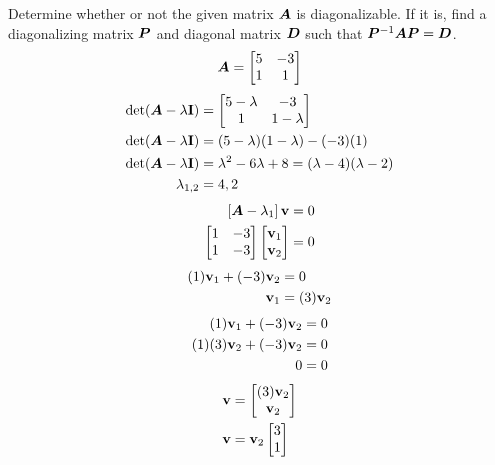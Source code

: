 \documentclass{article}
\begin{document}
Determine whether or not the given matrix $ \bm{A} $ is diagonalizable. If it is, find a diagonalizing matrix $ \bm{P} $ and diagonal matrix $ \bm{D} $ such that $ \bm{P}^{-1}\bm{A}\bm{P} = \bm{D} $.
\begin{equation*}
	\bm{A} =
		\begin{bmatrix}
			5 & -3 \\
			1 & 1
		\end{bmatrix}
\end{equation*}
\begin{align*}
	\det( \matr{A} - \lambda \vect{I} ) & =
		\begin{bmatrix}
			5 - \lambda & -3 \\
			1 & 1 - \lambda
		\end{bmatrix} \\
	\det( \matr{A} - \lambda \vect{I} ) & =
		(5 - \lambda)(1 - \lambda) - (-3)(1) \\
	\det( \matr{A} - \lambda \vect{I} ) & =
		\lambda^2 - 6\lambda + 8 = (\lambda - 4)(\lambda - 2) \\
	\lambda_{1,2} & = 4, 2
\end{align*}
\begin{align*}
	\left[ \matr{A} - \lambda_1 \right] \vect{v} & = 0 \\
	\begin{bmatrix}
		1 & -3 \\
		1 & -3
	\end{bmatrix}
	\begin{bmatrix} \vect{v}_1 \\ \vect{v}_2 \end{bmatrix} & = 0
\end{align*}
\begin{align*}
	(1)\vect{v}_1 + (-3)\vect{v}_2 & = 0 \\
	\vect{v}_1 & = (3)\vect{v}_2
\end{align*}
\begin{align*}
	(1)\vect{v}_1 + (-3)\vect{v}_2 & = 0 \\
	(1)(3)\vect{v}_2 + (-3)\vect{v}_2 & = 0 \\
	0 & = 0
\end{align*}
\begin{align*}
	\vect{v} & = \begin{bmatrix} (3)\vect{v}_2 \\ \vect{v}_2 \end{bmatrix} \\
	\vect{v} & = \vect{v}_2 \begin{bmatrix} 3 \\ 1 \end{bmatrix}
\end{align*}
\end{document}
